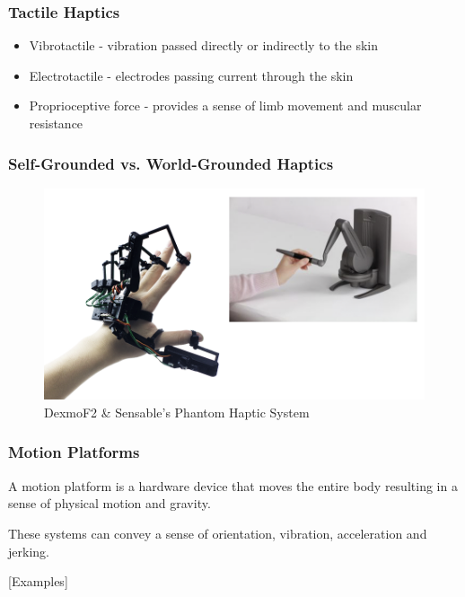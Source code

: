 \begin{frame}
	
	\frametitle{Tactile Haptics}
	
	\begin{itemize}
		\item Vibrotactile - vibration passed directly or indirectly to the skin
		\item Electrotactile - electrodes passing current through the skin
		\item Proprioceptive force - provides a sense of limb movement and muscular resistance
	\end{itemize}	
	
\end{frame}

\begin{frame}
	\frametitle{Self-Grounded vs. World-Grounded Haptics}
	\begin{figure}
		\includegraphics[scale=0.3]{assets/self-world.png}
		\caption{DexmoF2 \& Sensable's Phantom Haptic System}
	\end{figure}
	
\end{frame}

\begin{frame}
	\frametitle{Motion Platforms}
	A motion platform is a hardware device that moves the entire body resulting in a sense of physical motion and gravity. 
	\vspace{.2in}
	
	
	These systems can convey a sense of orientation, vibration, acceleration and jerking.	
	\vspace{.2in}
	
	
	[Examples]
	
\end{frame}


